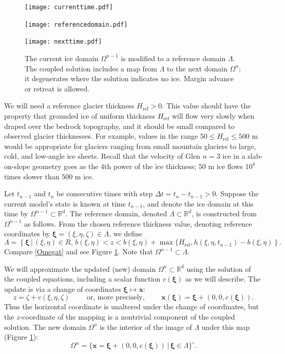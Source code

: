 \documentclass[letterpaper,final,12pt,reqno]{amsart}
\newcommand{\RR}{\mathbb{R}}
\newcommand{\bx}{\mathbf{x}}
\newcommand{\bxi}{\bm{\xi}}
\newcommand{\Href}{H_{\text{ref}}}
\begin{document}
\begin{figure}[ht]
\begin{center}
\texttt{[image: currenttime.pdf]}
\vspace{-6mm}

\texttt{[image: referencedomain.pdf]}
\vspace{-1mm}

\texttt{[image: nexttime.pdf]}
\end{center}
\caption{The current ice domain $\Omega^{n-1}$ is modified to a reference domain $\Lambda$.  The coupled solution includes a map from $\Lambda$ to the next domain $\Omega^n$; it degenerates where the solution indicates no ice.  Margin advance or retreat is allowed.}
\label{fig:domainupdate}
\end{figure}

We will need a reference glacier thickness $\Href>0$.  This value should have the property that grounded ice of uniform thickness $\Href$ will flow very slowly when draped over the bedrock topography, and it should be small compared to observed glacier thicknesses.  For example, values in the range $50 \le \Href \le 500$ m would be appropriate for glaciers ranging from small mountain glaciers to large, cold, and low-angle ice sheets.  Recall that the velocity of Glen $n=3$ ice in a slab-on-slope geometry \cite{GreveBlatter2009} goes as the $4$th power of the ice thickness; $50$ m ice flows $10^4$ times slower than $500$ m ice.

Let $t_{n-1}$ and $t_n$ be consecutive times with step $\Delta t = t_n - t_{n-1} > 0$.  Suppose the current model's state is known at time $t_{n-1}$, and denote the ice domain at this time by $\Omega^{n-1} \subset \RR^d$.  The reference domain, denoted $\Lambda \subset \RR^d$, is constructed from $\Omega^{n-1}$ as follows.  From the chosen reference thickness value, denoting reference coordinates by $\bxi=(\xi,\eta,\zeta) \in \Lambda$, we define
\begin{equation}
\Lambda = \left\{\bxi\,\big|\,(\xi,\eta)\in R, \, b(\xi,\eta) < z < b(\xi,\eta) + \max\{\Href,h(\xi,\eta,t_{n-1})-b(\xi,\eta)\right\}.  \label{Lambda}
\end{equation}
Compare \eqref{Omegat} and see Figure \ref{fig:domainupdate}.  Note that $\Omega^{n-1} \subset \Lambda$.

We will approximate the updated (new) domain $\Omega^n \subset \RR^d$ using the solution of the coupled equations, including a scalar function $c(\bxi)$ as we will describe.  The update is via a change of coordinates $\bxi \mapsto \bx$:
\begin{equation}
z=\zeta+c(\xi,\eta,\zeta) \qquad \text{ or, more precisely, } \qquad \bx(\bxi) = \bxi + (0,0,c(\bxi)). \label{changecoords}
\end{equation}
Thus the horizontal coordinate is unaltered under the change of coordinates, but the $z$-coordinate of the mapping is a nontrivial component of the coupled solution.  The new domain $\Omega^n$ is the interior of the image of $\Lambda$ under this map (Figure \ref{fig:domainupdate}):
\begin{equation}
\Omega^n = \{\bx=\bxi + (0,0,c(\bxi)) \,\big|\, \bxi \in \Lambda\}^\circ. \label{updateddomain}
\end{equation}
\end{document}
